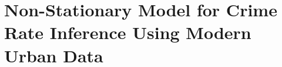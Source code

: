 \chapter{Non-Stationary Model for Crime Rate Inference Using Modern Urban Data}
\label{ch:non-stationary}


